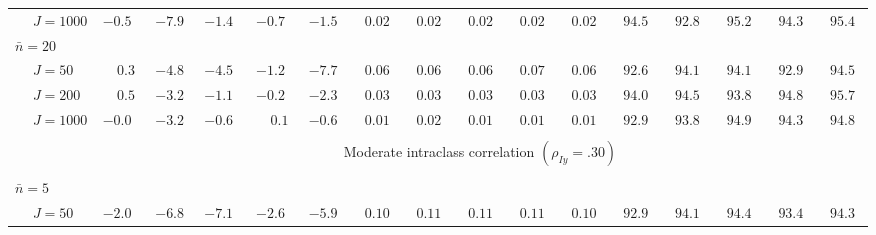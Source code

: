 \begin{sidewaystable}
\begin{threeparttable}
\begin{tabular}{llccccccccccccccc}
 & \nopagebreak $\;J=1000$  & ${-}0.5\phantom{0}$ & ${-}7.9\phantom{0}$ & ${-}1.4\phantom{0}$ & ${-}0.7\phantom{0}$ & ${-}1.5\phantom{0}$ & $\phantom{0}0.02\phantom{0}$ & $\phantom{0}0.02\phantom{0}$ & $\phantom{0}0.02\phantom{0}$ & $\phantom{0}0.02\phantom{0}$ & $\phantom{0}0.02\phantom{0}$ & $\phantom{0}94.5\phantom{0}$ & $\phantom{0}92.8\phantom{0}$ & $\phantom{0}95.2\phantom{0}$ & $\phantom{0}94.3\phantom{0}$ & $\phantom{0}95.4\phantom{0}$ \\
\multicolumn{4}{l}{$\bar{n}=20$} \\  & \nopagebreak $\;J=50$  & $\phantom{-}0.3\phantom{0}$ & ${-}4.8\phantom{0}$ & ${-}4.5\phantom{0}$ & ${-}1.2\phantom{0}$ & ${-}7.7\phantom{0}$ & $\phantom{0}0.06\phantom{0}$ & $\phantom{0}0.06\phantom{0}$ & $\phantom{0}0.06\phantom{0}$ & $\phantom{0}0.07\phantom{0}$ & $\phantom{0}0.06\phantom{0}$ & $\phantom{0}92.6\phantom{0}$ & $\phantom{0}94.1\phantom{0}$ & $\phantom{0}94.1\phantom{0}$ & $\phantom{0}92.9\phantom{0}$ & $\phantom{0}94.5\phantom{0}$ \\
 & \nopagebreak $\;J=200$  & $\phantom{-}0.5\phantom{0}$ & ${-}3.2\phantom{0}$ & ${-}1.1\phantom{0}$ & ${-}0.2\phantom{0}$ & ${-}2.3\phantom{0}$ & $\phantom{0}0.03\phantom{0}$ & $\phantom{0}0.03\phantom{0}$ & $\phantom{0}0.03\phantom{0}$ & $\phantom{0}0.03\phantom{0}$ & $\phantom{0}0.03\phantom{0}$ & $\phantom{0}94.0\phantom{0}$ & $\phantom{0}94.5\phantom{0}$ & $\phantom{0}93.8\phantom{0}$ & $\phantom{0}94.8\phantom{0}$ & $\phantom{0}95.7\phantom{0}$ \\
 & \nopagebreak $\;J=1000$  & ${-}0.0\phantom{0}$ & ${-}3.2\phantom{0}$ & ${-}0.6\phantom{0}$ & $\phantom{-}0.1\phantom{0}$ & ${-}0.6\phantom{0}$ & $\phantom{0}0.01\phantom{0}$ & $\phantom{0}0.02\phantom{0}$ & $\phantom{0}0.01\phantom{0}$ & $\phantom{0}0.01\phantom{0}$ & $\phantom{0}0.01\phantom{0}$ & $\phantom{0}92.9\phantom{0}$ & $\phantom{0}93.8\phantom{0}$ & $\phantom{0}94.9\phantom{0}$ & $\phantom{0}94.3\phantom{0}$ & $\phantom{0}94.8\phantom{0}$ \\
[0.5ex]\hline\\[-1.6ex] 
& & \multicolumn{15}{c}{Moderate intraclass correlation $(\rho_{Iy}=.30)$} \\[0.6ex]\hline\\[-1.8ex]
\multicolumn{4}{l}{$\bar{n}=5$} \\  & \nopagebreak $\;J=50$  & ${-}2.0\phantom{0}$ & ${-}6.8\phantom{0}$ & ${-}7.1\phantom{0}$ & ${-}2.6\phantom{0}$ & ${-}5.9\phantom{0}$ & $\phantom{0}0.10\phantom{0}$ & $\phantom{0}0.11\phantom{0}$ & $\phantom{0}0.11\phantom{0}$ & $\phantom{0}0.11\phantom{0}$ & $\phantom{0}0.10\phantom{0}$ & $\phantom{0}92.9\phantom{0}$ & $\phantom{0}94.1\phantom{0}$ & $\phantom{0}94.4\phantom{0}$ & $\phantom{0}93.4\phantom{0}$ & $\phantom{0}94.3\phantom{0}$ \\

\end{tabular}
\end{threeparttable}
\end{sidewaystable}
